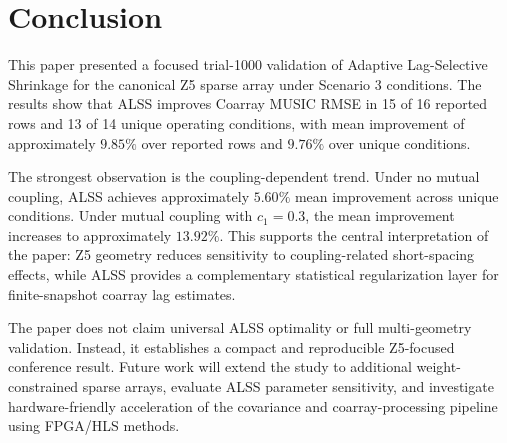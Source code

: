 \documentclass[conference]{IEEEtran}
\begin{document}
\section{Conclusion}

This paper presented a focused trial-1000 validation of Adaptive Lag-Selective Shrinkage for the canonical Z5 sparse array under Scenario 3 conditions. The results show that ALSS improves Coarray MUSIC RMSE in 15 of 16 reported rows and 13 of 14 unique operating conditions, with mean improvement of approximately $9.85\%$ over reported rows and $9.76\%$ over unique conditions.

The strongest observation is the coupling-dependent trend. Under no mutual coupling, ALSS achieves approximately $5.60\%$ mean improvement across unique conditions. Under mutual coupling with $c_1=0.3$, the mean improvement increases to approximately $13.92\%$. This supports the central interpretation of the paper: Z5 geometry reduces sensitivity to coupling-related short-spacing effects, while ALSS provides a complementary statistical regularization layer for finite-snapshot coarray lag estimates.

The paper does not claim universal ALSS optimality or full multi-geometry validation. Instead, it establishes a compact and reproducible Z5-focused conference result. Future work will extend the study to additional weight-constrained sparse arrays, evaluate ALSS parameter sensitivity, and investigate hardware-friendly acceleration of the covariance and coarray-processing pipeline using FPGA/HLS methods.


\end{document}
